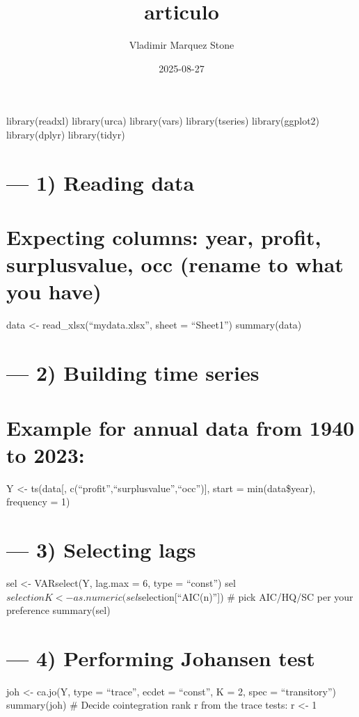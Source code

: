 \documentclass[
]{article}
\title{articulo}
\author{Vladimir Marquez Stone}
\date{2025-08-27}
\begin{document}
\maketitle

library(readxl) library(urca) library(vars) library(tseries)
library(ggplot2) library(dplyr) library(tidyr)

\section{--- 1) Reading data}\label{reading-data}

\section{Expecting columns: year, profit, surplusvalue, occ (rename to
what you
have)}\label{expecting-columns-year-profit-surplusvalue-occ-rename-to-what-you-have}

data \textless- read\_xlsx(``mydata.xlsx'', sheet = ``Sheet1'')
summary(data)

\section{--- 2) Building time series}\label{building-time-series}

\section{Example for annual data from 1940 to
2023:}\label{example-for-annual-data-from-1940-to-2023}

Y \textless- ts(data{[}, c(``profit'',``surplusvalue'',``occ''){]},
start = min(data\$year), frequency = 1)

\section{--- 3) Selecting lags}\label{selecting-lags}

sel \textless- VARselect(Y, lag.max = 6, type = ``const'')
sel\(selection
K <- as.numeric(sel\)selection{[}``AIC(n)''{]}) \# pick AIC/HQ/SC per
your preference summary(sel)

\section{--- 4) Performing Johansen
test}\label{performing-johansen-test}

joh \textless- ca.jo(Y, type = ``trace'', ecdet = ``const'', K = 2, spec
= ``transitory'') summary(joh) \# Decide cointegration rank r from the
trace tests: r \textless- 1
\end{document}
